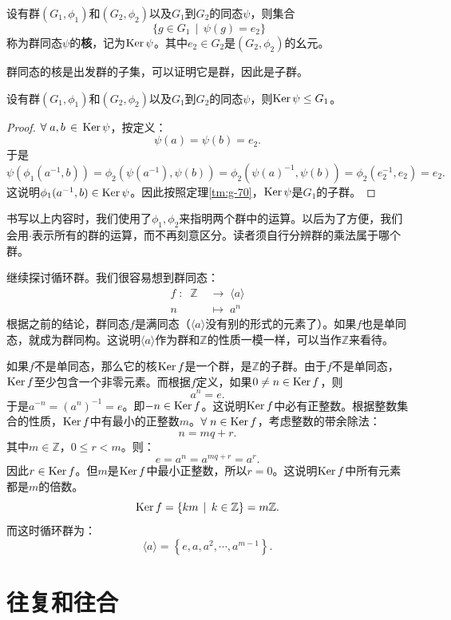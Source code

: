 \documentclass[12pt,UTF8,fontset=none]{ctexbook}
\begin{document}
\begin{df}
    设有群$(G_1, \phi_1)$和$(G_2, \phi_2)$以及$G_1$到$G_2$的同态$\psi$，则集合
    $$\;\{g\in G_1\, \mid \, \psi(g) = e_2\}$$
    称为群同态$\psi$的\textbf{核}，记为$\mathrm{Ker\,} \psi$。其中$e_2\in G_2$是$(G_2, \phi_2)$的幺元。
\end{df}
群同态的核是出发群的子集，可以证明它是群，因此是子群。
\begin{tm}
    设有群$(G_1, \phi_1)$和$(G_2, \phi_2)$以及$G_1$到$G_2$的同态$\psi$，则$\mathrm{Ker\,} \psi\leq G_1$。
\end{tm}
\begin{proof}
    $\forall \;a,b\,\in\,\mathrm{Ker\,} \psi$，按定义：
    $$
    \psi(a) = \psi(b) = e_2.
    $$
    于是
    $$
        \psi(\phi_1(a^{-1},b)) = \phi_2(\psi(a^{-1}),\psi(b)) = \phi_2(\psi(a)^{-1},\psi(b)) = \phi_2(e_2^{-1}, e_2) = e_2.
    $$
    这说明$\phi_1(a^{-1},b)\in \mathrm{Ker\,} \psi$。因此按照定理\ref{tm:g-70}，$\mathrm{Ker\,} \psi$是$G_1$的子群。
\end{proof}

书写以上内容时，我们使用了$\phi_1, \phi_2$来指明两个群中的运算。以后为了方便，我们会用$\cdot$表示所有的群的运算，而不再刻意区分。读者须自行分辨群的乘法属于哪个群。

继续探讨循环群。我们很容易想到群同态：
\begin{align*}
    f \;:\;\; \mathbb{Z} \; &\longrightarrow \; \langle a\rangle \\
    n \; &\longmapsto \; a^n
\end{align*}
根据之前的结论，群同态$f$是满同态（$\langle a\rangle$没有别的形式的元素了）。如果$f$也是单同态，就成为群同构。这说明$\langle a\rangle$作为群和$\mathbb{Z}$的性质一模一样，可以当作$\mathbb{Z}$来看待。

如果$f$不是单同态，那么它的核$\mathrm{Ker\,} f$是一个群，是$\mathbb{Z}$的子群。由于$f$不是单同态，$\mathrm{Ker\,} f$至少包含一个非零元素。而根据$f$定义，如果$0\neq n\in\mathrm{Ker\,} f$，则
$$ a^n = e. $$
于是$a^{-n} = \left(a^n\right)^{-1} = e$。即$-n\in\mathrm{Ker\,} f$。这说明$\mathrm{Ker\,} f$中必有正整数。根据整数集合的性质，$\mathrm{Ker\,} f$中有最小的正整数$m$。$\forall \; n\in\mathrm{Ker\,} f$，考虑整数的带余除法：
$$ n = mq + r.$$
其中$m\in\mathbb{Z}$，$0\leqslant r < m$。则：
$$ e = a^n = a^{mq+r} = a^r.$$
因此$r\in\mathrm{Ker\,} f$。但$m$是$\mathrm{Ker\,} f$中最小正整数，所以$r = 0$。这说明$\mathrm{Ker\,} f$中所有元素都是$m$的倍数。
$$ \mathrm{Ker\,} f = \{km \, \mid \, k\in\mathbb{Z}\} = m\mathbb{Z}. $$
而这时循环群为：
$$ \langle a\rangle = \left\{ e, a, a^2, \cdots, a^{m-1} \right\}. $$

\section{往复和往合}
\end{document}
